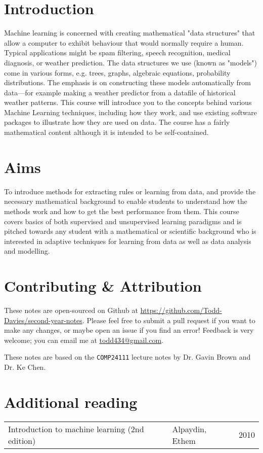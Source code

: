 \section*{Introduction}

Machine learning is concerned with creating mathematical "data structures" that
allow a computer to exhibit behaviour that would normally require a human.
Typical applications might be spam filtering, speech recognition, medical
diagnosis, or weather prediction. The data structures we use (known as "models")
come in various forms, e.g. trees, graphs, algebraic equations, probability
distributions. The emphasis is on constructing these models automatically from
data---for example making a weather predictor from a datafile of historical
weather patterns. This course will introduce you to the concepts behind various
Machine Learning techniques, including how they work, and use existing software
packages to illustrate how they are used on data. The course has a fairly
mathematical content although it is intended to be self-contained.

\section*{Aims}

To introduce methods for extracting rules or learning from data, and provide the
necessary mathematical background to enable students to understand how the
methods work and how to get the best performance from them. This course covers
basics of both supervised and unsupervised learning paradigms and is pitched
towards any student with a mathematical or scientific background who is
interested in adaptive techniques for learning from data as well as data
analysis and modelling.

\section*{Contributing \& Attribution}

These notes are open-sourced on Github at
\url{https://github.com/Todd-Davies/second-year-notes}. Please feel free to
submit a pull request if you want to make any changes, or maybe open an issue
if you find an error! Feedback is very welcome; you can email me at
\href{mailto:todd434@gmail.com}{todd434@gmail.com}.

These notes are based on the \texttt{COMP24111} lecture notes by Dr. Gavin Brown
and Dr. Ke Chen.

\section*{Additional reading}

\begin{tabularx}{\textwidth}{X|X|l}
   Introduction to machine learning (2nd edition) & Alpaydin, Ethem & 2010\\
\end{tabularx}